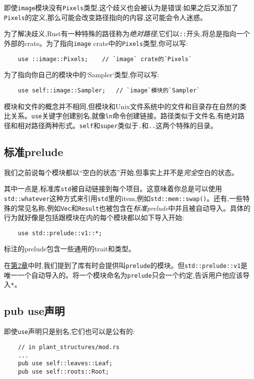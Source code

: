 即使\texttt{image}模块没有\texttt{Pixels}类型,这个歧义也会被认为是错误:如果之后又添加了\texttt{Pixels}的定义,那么可能会改变路径指向的内容,这可能会令人迷惑。

为了解决歧义,Rust有一种特殊的路径称为\emph{绝对路径},它们以\texttt{::}开头,将总是指向一个外部的crate。为了指向\texttt{image} crate中的\texttt{Pixels}类型,你可以写:
\begin{verbatim}
    use ::image::Pixels;    // `image` crate的`Pixels`
\end{verbatim}

为了指向你自己的模块中的`Sampler`类型,你可以写:
\begin{verbatim}
    use self::image::Sampler;   // `image`模块的`Sampler`
\end{verbatim}

模块和文件的概念并不相同,但模块和Unix文件系统中的文件和目录存在自然的类比关系。\texttt{use}关键字创建别名,就像\texttt{ln}命令创建链接。路径类似于文件名,有绝对路径和相对路径两种形式。\texttt{self}和\texttt{super}类似于\texttt{.}和\texttt{..}这两个特殊的目录。

\subsection{标准prelude}
我们之前说每个模块都以“空白的状态”开始,但事实上并不是\emph{完全}空白的状态。

其中一点是,标准库\texttt{std}被自动链接到每个项目。这意味着你总是可以使用\texttt{std::whatever}这种方式来引用\texttt{std}里的item,例如\texttt{std::mem::swap()}。还有,一些特殊的常见名称,例如\texttt{Vec}和\texttt{Result}也被包含在\emph{标准prelude}中并且被自动导入。具体的行为就好像是包括跟模块在内的每个模块都以如下导入开始:
\begin{verbatim}
    use std::prelude::v1::*;
\end{verbatim}

标注的prelude包含一些通用的trait和类型。

在\hyperref[ch02]{第2章}中时,我们提到了库有时会提供叫\texttt{prelude}的模块。但\texttt{std::prelude::v1}是唯一一个自动导入的。将一个模块命名为\texttt{prelude}只会一个约定,告诉用户他应该导入\texttt{*}。

\subsection{pub use声明}
即使\texttt{use}声明只是别名,它们也可以是公有的:
\begin{verbatim}
    // in plant_structures/mod.rs
    ...
    pub use self::leaves::Leaf;
    pub use self::roots::Root;
\end{verbatim}


